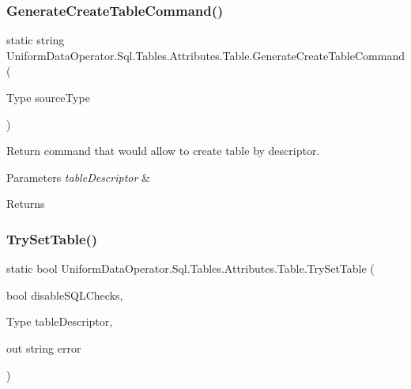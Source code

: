 \subsubsection{\texorpdfstring{Generate\+Create\+Table\+Command()}{GenerateCreateTableCommand()}}
{\footnotesize\ttfamily static string Uniform\+Data\+Operator.\+Sql.\+Tables.\+Attributes.\+Table.\+Generate\+Create\+Table\+Command (\begin{DoxyParamCaption}\item[{Type}]{source\+Type }\end{DoxyParamCaption})\hspace{0.3cm}{\ttfamily [static]}}



Return command that would allow to create table by descriptor. 


\begin{DoxyParams}{Parameters}
{\em table\+Descriptor} & \\
\hline
\end{DoxyParams}
\begin{DoxyReturn}{Returns}

\end{DoxyReturn}
\mbox{\label{class_uniform_data_operator_1_1_sql_1_1_tables_1_1_attributes_1_1_table_a609ed9b13e7e9007709d76a6f08d96e8}} 
\subsubsection{\texorpdfstring{Try\+Set\+Table()}{TrySetTable()}}
{\footnotesize\ttfamily static bool Uniform\+Data\+Operator.\+Sql.\+Tables.\+Attributes.\+Table.\+Try\+Set\+Table (\begin{DoxyParamCaption}\item[{bool}]{disable\+S\+Q\+L\+Checks,  }\item[{Type}]{table\+Descriptor,  }\item[{out string}]{error }\end{DoxyParamCaption})\hspace{0.3cm}{\ttfamily [static]}}




